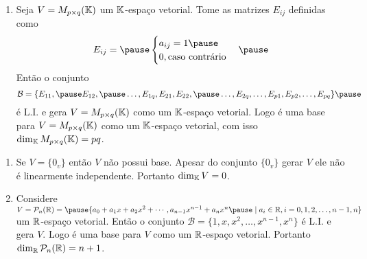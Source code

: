 \documentclass{beamer}
\begin{document}
\begin{frame}
    \begin{exemplos}
        \begin{enumerate}[label={\roman*})]
            \conti
            \item Seja $V = M_{p \times q}(\mathbb{K})$ \pause um $\mathbb{K}$-espaço vetorial. \pause Tome as matrizes $E_{ij}$ \pause definidas como\pause
            \[
                E_{ij} = \pause \begin{cases}a_{ij} = 1\pause \\0, \mbox{caso contrário}\end{cases}\pause
            \]
            Então o conjunto
            \[
                \mathcal{B} = \{E_{11}, \pause E_{12}, \pause \dots, E_{1q}, E_{21}, E_{22}, \pause \dots, E_{2q}, \dots, E_{p1}, E_{p2}, \dots, E_{pq}\}\pause
            \]
            é L.I. \pause e gera $V = M_{p \times q}(\mathbb{K})$ \pause como um $\mathbb{K}$-espaço vetorial. \pause Logo é uma base para $V = M_{p \times q}(\mathbb{K})$ \pause como um $\mathbb{K}$-espaço vetorial, \pause com isso $\dim_{\mathbb{K}}M_{p \times q}(\mathbb{K}) = pq$.
            \seti
        \end{enumerate}
    \end{exemplos}
\end{frame}

\begin{frame}
    \begin{exemplos}
        \begin{enumerate}[label={\roman*})]
            \conti
            \item Se $V = \{0_v\}$ então $V$ não possui base. \pause Apesar do conjunto $\{0_v\}$ \pause gerar $V$ ele não é linearmente independente. \pause Portanto $\dim_{\mathbb{K}}V = 0$.\pause
            \vspace*{1cm}

            \item Considere $V = \mathcal{P}_n(\real) = \pause \{a_0 + a_1x + a_2x^2 + \cdots, a_{n - 1}x^{n - 1} + a_nx^n \pause \mid a_i \in \real, i = 0, 1, 2, \dots, n - 1, n\}$ \pause um $\mathbb{R}$-espaço vetorial. \pause Então o conjunto $\mathcal{B} = \{1, x, x^2, \dots, x^{n - 1}, x^n\}$ \pause é L.I. e gera $V$. \pause Logo é uma base para $V$ \pause como um $\mathbb{R}$-espaço vetorial. \pause Portanto $\dim_{\mathbb{R}}\mathcal{P}_n(\mathbb{R}) = n + 1$.

            \seti
        \end{enumerate}
    \end{exemplos}
\end{frame}
\end{document}
